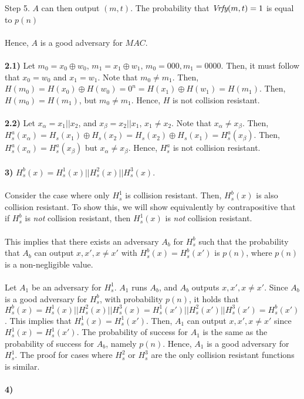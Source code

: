 \documentclass[12pt]{article}
\begin{document}
Step 5. $A$ can then output $(m, t)$. The probability that $\emph{Vrfy}(m,t)=1$ is equal to $p(n)$
\\
\\
Hence, $A$ is a good adversary for $MAC$.
\\
\\
\noindent \textbf{2.1)} Let $m_0 = x_0 \oplus w_0$, $m_1 = x_1 \oplus w_1$, $m_0 = 000, m_1=0000$. Then, it must follow that $x_0 = w_0$ and $x_1 = w_1$. Note that $m_0 \neq m_1$. Then, $H(m_0) = H(x_0) \oplus H(w_0) = 0^n = H(x_1) \oplus H(w_1) = H(m_1)$. Then, $H(m_0) = H(m_1)$, but $m_0 \neq m_1$. Hence, $H$ is not collision resistant.
\\
\\
\noindent \textbf{2.2)} Let $x_\alpha = x_1 || x_2$, and $x_\beta = x_2 || x_1$, $x_1 \neq x_2$. Note that $x_\alpha \neq x_\beta$. Then, $H_s^a(x_\alpha) = H_s(x_1) \oplus H_s(x_2) = H_s(x_2) \oplus H_s(x_1) = H_s^a(x_\beta)$. Then, $H_s^a(x_\alpha)= H_s^a(x_\beta)$ but $x_\alpha \neq x_\beta$. Hence, $H_s^a$ is not collision resistant.
\\
\\
\noindent \textbf{3)} $H_s^b(x) = H_s^1(x)||H_s^2(x)||H_s^3(x)$.
\\
\\
Consider the case where only $H_s^1$ is collision resistant. Then, $H_s^b(x)$ is also collision resistant. To show this, we will show equivalently by contrapositive that if $H_s^b$ is \emph{not} collision resistant, then $H_s^1(x)$ is \emph{not} collision resistant.
\\
\\
This implies that there exists an adversary $A_b$ for $H_s^b$ such that the probability that $A_b$ can output $x, x', x \neq x'$ with $H_s^b(x) = H_s^b(x')$ is $p(n)$, where $p(n)$ is a non-negligible value.
\\
\\
Let $A_1$ be an adversary for $H_s^1$. $A_1$ runs $A_b$, and $A_b$ outputs $x, x', x \neq x'$. Since $A_b$ is a good adversary for $H_s^b$, with probability $p(n)$, it holds that $H_s^b(x) = H_s^1(x)||H_s^2(x)||H_s^3(x) =  H_s^1(x')||H_s^2(x')||H_s^3(x') = H_s^b(x')$. This implies that $H_s^1(x) = H_s^1(x')$. Then, $A_1$ can output $x,x',x \neq x'$ since $H_s^1(x) = H_s^1(x')$. The probability of success for $A_1$ is the same as the probability of success for $A_b$, namely $p(n)$. Hence, $A_1$ is a good adversary for $H_s^1$. The proof for cases where $H_s^2$ or $H_s^3 $ are the only collision resistant functions is similar.
\\
\\
\noindent \textbf{4)} 
\end{document}
